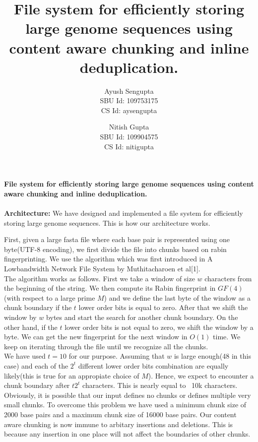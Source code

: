 \documentclass {article}
\begin{document}
\title {File system for efficiently storing large genome sequences using content aware chunking and inline deduplication. }
\author {Ayush Sengupta\\SBU Id: 109753175\\CS Id: aysengupta \and
Nitish Gupta\\SBU Id: 109904575\\CS Id: nitigupta}
\noindent\textbf{File system for efficiently storing large genome sequences using content aware chunking and inline deduplication.}
\\\\
\textbf{Architecture:}
\noindent We have designed and implemented a file system for efficiently storing large genome sequences. This is how our architecture works. 

\noindent First, given a large fasta file where each base pair is represented using one byte(UTF-8 encoding), we first divide the file into chunks based on rabin fingerprinting. We use the algorithm which was first introduced in A Lowbandwidth Network File System by Muthitacharoen et al[1].\\

\noindent The algorithm works as follows. First we take a window of size $w$ characters from the beginning of the string. We then compute its Rabin fingerprint in $GF(4)$(with respect to a large prime $M$) and we define the last byte of the window as a chunk boundary if the $t$ lower order bits is equal to zero. After that we shift the window by $w$ bytes and start the search for another chunk boundary. On the other hand, if the $t$ lower order bits is not equal to zero, we shift the window by a byte. We can get the new fingerprint for the next window in $O(1)$ time. We keep on iterating through the file until we recognize all the chunks.\\

\noindent We have used $t=10$ for our purpose. Assuming that $w$ is large enough(48 in this case) and each of the $2^t$ different lower order bits combination are equally likely(this is true for an appropiate choice of $M$). Hence, we expect to encounter a chunk boundary after $t2^t$ characters. This is nearly equal to ~10k characters. Obviously, it is possible that our input defines no chunks or defines multiple very small chunks. To overcome this problem we have used a minimum chunk size of 2000 base pairs and a maximum chunk size of 16000 base pairs. Our content aware chunking is now immune to arbitary insertions and deletions. This is because any insertion in one place will not affect the boundaries of other chunks.\\     
\end{document}
